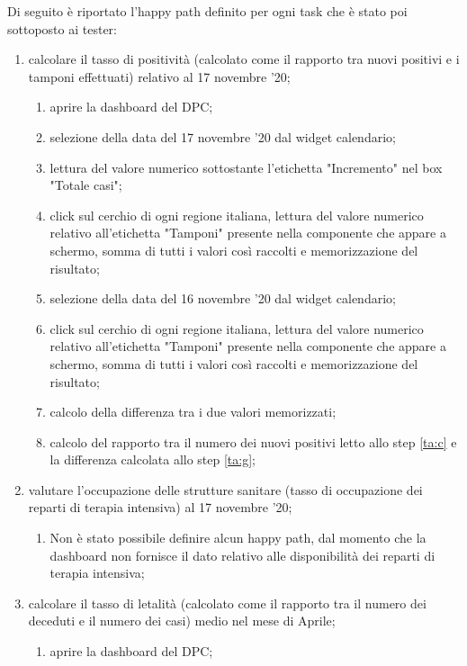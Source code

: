 Di seguito è riportato l'happy path definito per ogni task che è stato poi sottoposto ai tester:
\begin{enumerate}
    \item calcolare il tasso di positività (calcolato come il rapporto tra nuovi positivi e i tamponi effettuati) relativo al 17 novembre '20;    
    \begin{enumerate}[label=\alph*.]
        \item aprire la dashboard del DPC;
        \item selezione della data del 17 novembre '20 dal widget calendario;
        \item lettura del valore numerico sottostante l'etichetta "Incremento" nel box "Totale casi";\label{ta:c}
        \item click sul cerchio di ogni regione italiana, lettura del valore numerico relativo all'etichetta "Tamponi" presente nella componente che appare a schermo, somma di tutti i valori così raccolti e memorizzazione del risultato;
        \item selezione della data del 16 novembre '20 dal widget calendario;
        \item click sul cerchio di ogni regione italiana, lettura del valore numerico relativo all'etichetta "Tamponi" presente nella componente che appare a schermo, somma di tutti i valori così raccolti e memorizzazione del risultato;
        \item calcolo della differenza tra i due valori memorizzati;\label{ta:g}
        \item calcolo del rapporto tra il numero dei nuovi positivi letto allo step \ref{ta:c} e la differenza calcolata allo step \ref{ta:g};
    \end{enumerate}
    \item valutare l'occupazione delle strutture sanitare (tasso di occupazione dei reparti di terapia intensiva) al 17 novembre '20;
    \begin{enumerate}[label=\alph*.]
        \item  Non è stato possibile definire alcun happy path, dal momento che la dashboard non fornisce il dato relativo alle disponibilità dei reparti di terapia intensiva;
    \end{enumerate}
    \item calcolare il tasso di letalità (calcolato come il rapporto tra il numero dei deceduti e il numero dei casi) medio nel mese di Aprile;
    \begin{enumerate}[label=\alph*.]
        \item aprire la dashboard del DPC;

\end{enumerate}
\end{enumerate}
